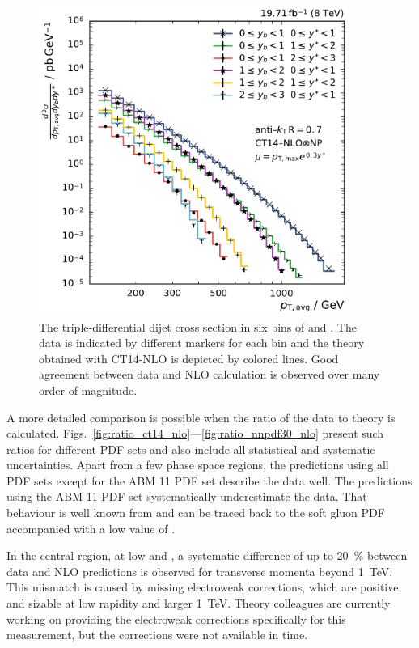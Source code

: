 \begin{figure}[h!tbp]
    \centering
    \includegraphics[width=0.9\textwidth]{figures/measurement/ptavg_spectrum.pdf}\hfill
    \caption[Spectrum of the Triple-differential Dijet Cross Section]{The
    triple-differential dijet cross section in six bins of \ystar and \yboost. The
    data is indicated by different markers for each bin and the theory obtained
    with CT14-NLO is depicted by colored lines. Good agreement between data and
    NLO calculation is observed over many order of magnitude.}
    \label{fig:measurement_result}
\end{figure}

A more detailed comparison is possible when the ratio of the data to theory is
calculated. Figs.~\ref{fig:ratio_ct14_nlo}---\ref{fig:ratio_nnpdf30_nlo} present
such ratios for different PDF sets and also include all statistical and
systematic uncertainties. Apart from a few phase space regions, the predictions
using all PDF sets except for the ABM 11 PDF set describe the data well. The
predictions using the ABM 11 PDF set systematically underestimate the data.
That behaviour is well known \eg from \cite{Khachatryan:2014waa,Stober:2012abc} and can be traced
back to the soft gluon PDF accompanied with a low value of \asmz.

In the central region, at low \yboost and \ystar, a systematic difference of up
to \SI{20}{\percent} between data and NLO predictions is observed for transverse
momenta beyond \SI{1}{\TeV}. This mismatch is caused by missing electroweak
corrections, which are positive and sizable at low rapidity and \pt larger
\SI{1}{\TeV}. Theory colleagues are currently working on providing the
electroweak corrections specifically for this measurement, but the corrections
were not available in time.

